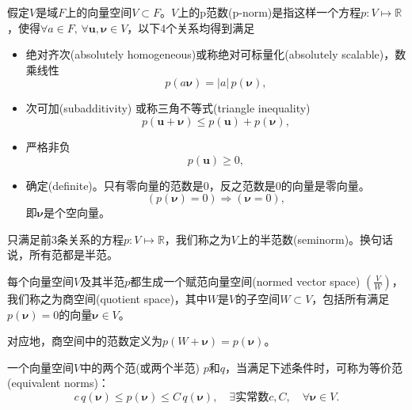  \begin{definition}[范数]
    \label{definition-norms}
    假定$V$是域$F$上的向量空间$V \subset F$。$V$上的p范数(p-norm)是指这样一个方程$p: V \mapsto \mathbb{R}$，使得$\forall a \in F, \, \forall \bm{u},\bm{\nu} \in V$，以下4个关系均得到满足
    \begin{itemize}
      \item 绝对齐次(absolutely homogeneous)或称绝对可标量化(absolutely scalable)，数乘线性
      \begin{equation*}
        p \left( a \bm{\nu} \right) = | a | \, p(\bm{\nu}),
      \end{equation*}
       \item 次可加(subadditivity) 或称三角不等式(triangle inequality)
      \begin{equation*}
        p\left( \bm{u} + \bm{\nu} \right) \le p\left( \bm{u} \right) + p\left( \bm{\nu} \right),
      \end{equation*}
      \item 严格非负
      \begin{equation*}
        p(\bm{u}) \ge 0,
      \end{equation*}
      \item 确定(definite)。只有零向量的范数是0，反之范数是0的向量是零向量。
      \begin{equation*}
        \left( p(\bm{\nu}) = 0  \right) \Rightarrow \left( \bm{\nu} = 0 \right),
      \end{equation*}
      即$\bm{\nu}$是个空向量。
    \end{itemize}

    只满足前3条关系的方程$p: V \mapsto \mathbb{R}$，我们称之为$V$上的半范数(seminorm)。换句话说，所有范都是半范。
  \end{definition}

  \begin{definition}[商空间]
    \label{definition-quotient-space}
  每个向量空间$V$及其半范$p$都生成一个赋范向量空间(normed vector space) $\left( \frac{V}{W} \right)$，我们称之为商空间(quotient space)，其中$W$是$V$的子空间$W \subset V$，包括所有满足$p(\bm{\nu}) = 0$的向量$\bm{\nu} \in V$。

    对应地，商空间中的范数定义为$p (W + \bm{\nu}) = p (\bm{\nu})$。
  \end{definition}

  \begin{definition}[等价范]
    一个向量空间$V$中的两个范(或两个半范) $p$和$q$，当满足下述条件时，可称为等价范(equivalent norms)：
    \begin{equation*}
      c \, q(\bm{\nu}) \le p(\bm{\nu}) \le C \, q(\bm{\nu}), \quad \exists \text{实常数} c,C, \quad \forall \bm{\nu} \in V.
    \end{equation*}
  \end{definition}

